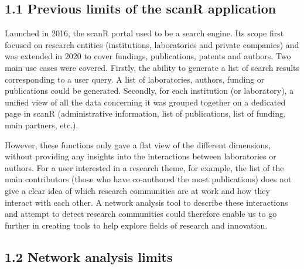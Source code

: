 \documentclass[
]{article}
\begin{document}
\hypertarget{previous-limits-of-the-scanr-application}{%
\subsection{1.1 Previous limits of the scanR
application}\label{previous-limits-of-the-scanr-application}}

Launched in 2016, the scanR portal used to be a search engine. Its scope
first focused on research entities (institutions, laboratories and
private companies) and was extended in 2020 to cover fundings,
publications, patents and authors. Two main use cases were covered.
Firstly, the ability to generate a list of search results corresponding
to a user query. A list of laboratories, authors, funding or
publications could be generated. Secondly, for each institution (or
laboratory), a unified view of all the data concerning it was grouped
together on a dedicated page in scanR (administrative information, list
of publications, list of funding, main partners, etc.).

However, these functions only gave a flat view of the different
dimensions, without providing any insights into the interactions between
laboratories or authors. For a user interested in a research theme, for
example, the list of the main contributors (those who have co-authored
the most publications) does not give a clear idea of which research
communities are at work and how they interact with each other. A network
analysis tool to describe these interactions and attempt to detect
research communities could therefore enable us to go further in creating
tools to help explore fields of research and innovation.

\hypertarget{network-analysis-limits}{%
\subsection{1.2 Network analysis limits}\label{network-analysis-limits}}
\end{document}
